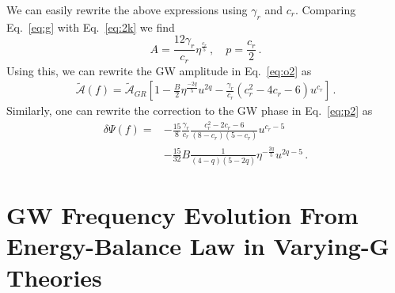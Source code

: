 \documentclass[prd,twocolumn,nofootinbib]{revtex4-1}
\begin{document}
We can easily rewrite the above expressions using $\gamma_r$ and $c_r$. 
Comparing Eq.~\eqref{eq:g} with Eq.~\eqref{eq:2k} we find
\begin{equation}\label{eq:i}
A=\frac{12\gamma_r}{c_r}\eta^{\frac{c_r}{5}}\,, \quad p=\frac{c_r}{2}\,.
\end{equation}
Using this, we can rewrite the GW amplitude in Eq.~\eqref{eq:o2} as
\begin{align}\label{eq:o}
\tilde{\mathcal{A}}(f)=\tilde{\mathcal{A}}_{GR} \left[1-\frac{B}{2}\eta^{\frac{-2q}{5}}u^{2q}-\frac{\gamma_r}{c_r}(c^2_r-4c_r-6)u^{c_r}\right]\,.
\end{align}
Similarly, one can rewrite the correction to the GW phase in Eq.~\eqref{eq:p2} as
\begin{align}\label{eq:p}
\delta\Psi(f)=&-\frac{15}{8}\frac{\gamma_r}{c_r}\frac{c_r^2-2c_r-6}{(8-c_r)(5-c_r)}u^{c_r-5}\nonumber\\ &-\frac{15}{32}B\frac{1}{(4-q)(5-2q)}\eta^{-\frac{2q}{5}}u^{2q-5}\,.
 \end{align}

\section{GW Frequency Evolution From Energy-Balance Law in Varying-G Theories} \label{appendix_2}
\end{document}
